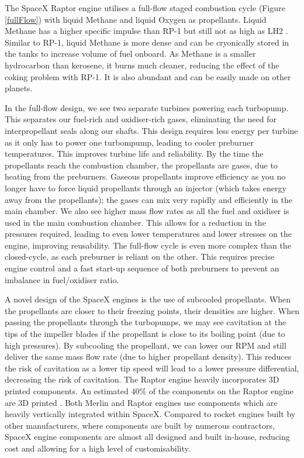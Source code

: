 \documentclass[11pt]{article}
\numberwithin{equation}{section}
\begin{document}
The SpaceX Raptor engine utilises a full-flow staged combustion cycle (Figure \ref{fullFlow}) with liquid Methane and liquid Oxygen as propellants. Liquid Methane has a higher specific impulse than RP-1 but still not as high as LH2 \cite{b1}. Similar to RP-1, liquid Methane is more dense and can be cryonically stored in the tanks to increase volume of fuel onboard. As Methane is a smaller hydrocarbon than kerosene, it burns much cleaner, reducing the effect of the coking problem with RP-1. It is also abundant and can be easily made on other planets.

In the full-flow design, we see two separate turbines powering each turbopump. This separates our fuel-rich and oxidiser-rich gases, eliminating the need for interpropellant seals along our shafts. This design requires less energy per turbine as it only has to power one turbompump, leading to cooler preburner temperatures. This improves turbine life and reliability. By the time the propellants reach the combustion chamber, the propellants are gases, due to heating from the preburners. Gaseous propellants improve efficiency as you no longer have to force liquid propellants through an injector (which takes energy away from the propellants); the gases can mix very rapidly and efficiently in the main chamber. We also see higher mass flow rates as all the fuel and oxidiser is used in the main combustion chamber. This allows for a reduction in the pressures required, leading to even lower temperatures and lower stresses on the engine, improving reusability. The full-flow cycle is even more complex than the closed-cycle, as each preburner is reliant on the other. This requires precise engine control and a fast start-up sequence of both preburners to prevent an imbalance in fuel/oxidiser ratio.

A novel design of the SpaceX engines is the use of subcooled propellants. When the propellants are closer to their freezing points, their densities are higher. When passing the propellants through the turbopumps, we may see cavitation at the tips of the impeller blades if the propellant is close to its boiling point (due to high pressures). By subcooling the propellant, we can lower our RPM and still deliver the same mass flow rate (due to higher propellant density). This reduces the risk of cavitation as a lower tip speed will lead to a lower pressure differential, decreasing the risk of cavitation. The Raptor engine heavily incorporates 3D printed components. An estimated 40\% of the components on the Raptor engine are 3D printed \cite{b7}. Both Merlin and Raptor engines use components which are heavily vertically integrated within SpaceX. Compared to rocket engines built by other manufacturers, where components are built by numerous contractors, SpaceX engine components are almost all designed and built in-house, reducing cost and allowing for a high level of customisability.
\end{document}

